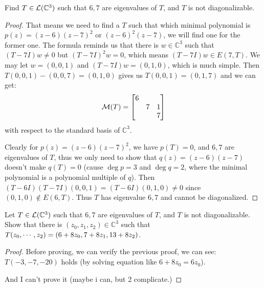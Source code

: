 \documentclass[../main.tex]{subfiles}
\begin{document}
\begin{exercise}
  Find $T \in \mathcal{L}(\mathbb{C}^3)$ such that
  $6, 7$ are eigenvalues of $T$,
  and $T$ is not diagonalizable.
\end{exercise}
\begin{proof}
  That means we need to find a $T$ such that which minimal polynomial is
  $p(z) = (z - 6)(z - 7)^2$ or $(z - 6)^2(z - 7)$, we will find one
  for the former one. The formula reminds us that there is $w \in \mathbb{C}^3$
  such that $(T - 7I)w \neq 0$ but $(T - 7I)^2w = 0$, which means $(T - 7I)w \in E(7, T)$.
  We may let $w = (0, 0, 1)$ and $(T - 7I)w = (0, 1, 0)$, which is much simple.
  Then $T(0, 0, 1) - (0, 0, 7) = (0, 1, 0)$ gives us $T(0, 0, 1) = (0, 1, 7)$
  and we can get:
  \[
  \mathcal{M}(T) = \begin{bmatrix}
    6 &   &   \\
      & 7 & 1 \\
      &   & 7 \\
  \end{bmatrix}
  \]
  with respect to the standard basis of $\mathbb{C}^3$.

  Clearly for $p(z) = (z - 6)(z - 7)^2$, we have $p(T) = 0$, and $6, 7$ are eigenvalues
  of $T$, thus we only need to show that $q(z) = (z - 6)(z - 7)$ doesn't make $q(T) = 0$
  (cause $\deg p = 3$ and $\deg q = 2$, where the minimal polynomial is a polynomial multiple of $q$).
  Then $(T - 6I)(T - 7I)(0, 0, 1) = (T - 6I)(0, 1, 0) \neq 0$ since $(0, 1, 0) \notin E(6, T)$.
  Thus $T$ has eigenvalue $6, 7$ and cannot be diagonalized.
\end{proof}

\begin{exercise}
  Let $T \in \mathcal{L}(\mathbb{C}^3)$ such that $6, 7$ are eigenvalues of $T$,
  and $T$ is not diagonalizable. Show that there is $(z_0, z_1, z_2) \in \mathbb{C}^3$
  such that $T(z_0 , \cdots , z_{2}) = (6 + 8z_0, 7 + 8z_1, 13 + 8z_2)$.
\end{exercise}
\begin{proof}
  Before proving, we can verify the previous proof, we can see:
  $T(-3, -7, -20)$ holds (by solving equation like $6 + 8z_0 = 6z_0$).

  And I can't prove it (maybe i can, but 2 complicate.)
\end{proof}
\end{document}
